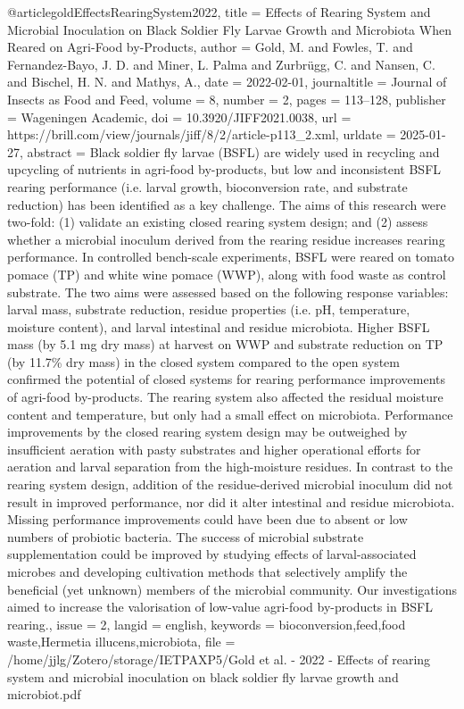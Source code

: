 {{{@article{goldEffectsRearingSystem2022,
  title = {Effects of Rearing System and Microbial Inoculation on Black Soldier Fly Larvae Growth and Microbiota When Reared on Agri-Food by-Products},
  author = {Gold, M. and Fowles, T. and Fernandez-Bayo, J. D. and Miner, L. Palma and Zurbrügg, C. and Nansen, C. and Bischel, H. N. and Mathys, A.},
  date = {2022-02-01},
  journaltitle = {Journal of Insects as Food and Feed},
  volume = {8},
  number = {2},
  pages = {113--128},
  publisher = {Wageningen Academic},
  doi = {10.3920/JIFF2021.0038},
  url = {https://brill.com/view/journals/jiff/8/2/article-p113_2.xml},
  urldate = {2025-01-27},
  abstract = {Black soldier fly larvae (BSFL) are widely used in recycling and upcycling of nutrients in agri-food by-products, but low and inconsistent BSFL rearing performance (i.e. larval growth, bioconversion rate, and substrate reduction) has been identified as a key challenge. The aims of this research were two-fold: (1) validate an existing closed rearing system design; and (2) assess whether a microbial inoculum derived from the rearing residue increases rearing performance. In controlled bench-scale experiments, BSFL were reared on tomato pomace (TP) and white wine pomace (WWP), along with food waste as control substrate. The two aims were assessed based on the following response variables: larval mass, substrate reduction, residue properties (i.e. pH, temperature, moisture content), and larval intestinal and residue microbiota. Higher BSFL mass (by 5.1 mg dry mass) at harvest on WWP and substrate reduction on TP (by 11.7\% dry mass) in the closed system compared to the open system confirmed the potential of closed systems for rearing performance improvements of agri-food by-products. The rearing system also affected the residual moisture content and temperature, but only had a small effect on microbiota. Performance improvements by the closed rearing system design may be outweighed by insufficient aeration with pasty substrates and higher operational efforts for aeration and larval separation from the high-moisture residues. In contrast to the rearing system design, addition of the residue-derived microbial inoculum did not result in improved performance, nor did it alter intestinal and residue microbiota. Missing performance improvements could have been due to absent or low numbers of probiotic bacteria. The success of microbial substrate supplementation could be improved by studying effects of larval-associated microbes and developing cultivation methods that selectively amplify the beneficial (yet unknown) members of the microbial community. Our investigations aimed to increase the valorisation of low-value agri-food by-products in BSFL rearing.},
  issue = {2},
  langid = {english},
  keywords = {bioconversion,feed,food waste,Hermetia illucens,microbiota},
  file = {/home/jjlg/Zotero/storage/IETPAXP5/Gold et al. - 2022 - Effects of rearing system and microbial inoculation on black soldier fly larvae growth and microbiot.pdf}
}

}}}
